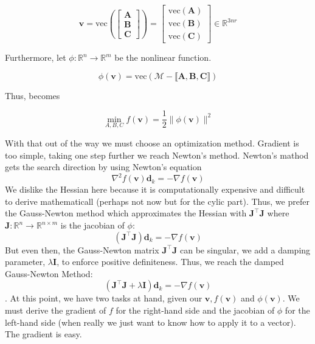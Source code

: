     \begin{equation*}
        \mathbf{v} = \text{vec}
        \left(
        \left[
            \begin{array}{c}
                \mathbf{A} \\
                \mathbf{B} \\
                \mathbf{C}
            \end{array}
        \right]
        \right) = 
        \left[
            \begin{array}{c}
                \text{vec}(\mathbf{A}) \\
                \text{vec}(\mathbf{B}) \\
                \text{vec}(\mathbf{C})
            \end{array}
        \right]
        \in \mathbb{R}^{3nr}
    \end{equation*}

    Furthermore, let $\phi: \mathbb{R}^n \to \mathbb{R}^m$ be the nonlinear
    function. 

    \begin{equation}
        \phi (\mathbf{v}) = \text{vec}(\mathcal{M} - \llbracket \mathbf{A, B, C} \rrbracket)
    \end{equation}

    Thus,  becomes 

    \begin{equation}
        \min_{A, B, C} f(\mathbf{v}) = \frac{1}{2} \|\phi (\mathbf{v})\|^2
    \end{equation}

    With that out of the way we must choose an optimization method. Gradient is
    too simple, taking one step further we reach Newton's method. Newton's
    mathod gets the search direction by using Newton's equation
    \[\nabla^2 f(\mathbf{v})\mathbf{d}_k = -\nabla f(\mathbf{v})\] We dislike
    the Hessian here because it is computationally expensive and difficult to
    derive mathematicall (perhaps not now but for the cylic part). Thus, we
    prefer the Gauss-Newton method which approximates the Hessian with
    $\mathbf{J^\intercal J}$ where $\mathbf{J}: \mathbb{R}^n\to
    \mathbb{R}^{n\times m}$ is the jacobian of $\phi$: \[(\mathbf{J^\intercal
    J})\mathbf{d}_k = -\nabla f(\mathbf{v})\] But even then, the Gauss-Newton
    matrix $\mathbf{J^\intercal J}$ can be singular, we add a damping parameter,
    $\lambda \mathbf{I}$, to enforce positive definiteness. Thus, we reach the
    damped Gauss-Newton Method: \[(\mathbf{J^\intercal J} +
    \lambda\mathbf{I})\mathbf{d}_k = -\nabla f(\mathbf{v})\]. At this point, we
    have two tasks at hand, given our $\mathbf{v}, f(\mathbf{v})$ and
    $\phi(\mathbf{v})$. We must derive the gradient of $f$ for the right-hand
    side and the jacobian of $\phi$ for the left-hand side (when really we just
    want to know how to apply it to a vector). The gradient is easy. 

